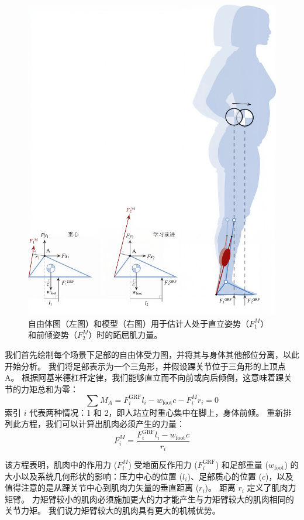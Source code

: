 \begin{figure}[!htb]
	\centering
	\includegraphics[width=0.9\linewidth]{chap6/6_1}
	\caption{自由体图（左图）和模型（右图）用于估计人处于直立姿势（$F_1^M$）和前倾姿势（$F_2^M$）时的跖屈肌力量。 \label{fig:6_1}}
\end{figure}


我们首先绘制每个场景下足部的自由体受力图，并将其与身体其他部位分离，以此开始分析。
我们将足部表示为一个三角形，并假设踝关节位于三角形的上顶点 A。
根据阿基米德杠杆定律，我们能够直立而不向前或向后倾倒，这意味着踝关节的力矩总和为零：
%
\begin{equation}
	\sum M_A = F_i ^{\text{GRF}} l_i 
				- w_\text{foot} c
				- F_i ^M r_i
				= 0
	\label{eq:6_1}
\end{equation}
%
索引 $i$ 代表两种情况：1 和 2，即人站立时重心集中在脚上，身体前倾。
重新排列此方程，我们可以计算出肌肉必须产生的力量：
%
\begin{equation}
	F_i ^M = 
		\frac{
			F_i ^{\text{GRF}} l_i
			- w_\text{foot} c
		}{
			r_i
		}
	\label{eq:6_2}
\end{equation}


该方程表明，肌肉中的作用力 ($F_i^M$) 受地面反作用力 ($F_i ^{\text{GRF}}$) 和足部重量 ($w_\text{foot}$) 的大小以及系统几何形状的影响：压力中心的位置 ($l_i$)、足部质心的位置 ($c$)，以及值得注意的是从踝关节中心到肌肉力矢量的垂直距离 ($r_i$)。
距离 $r_i$ 定义了肌肉力矩臂。
力矩臂较小的肌肉必须施加更大的力才能产生与力矩臂较大的肌肉相同的关节力矩。
我们说力矩臂较大的肌肉具有更大的机械优势。


